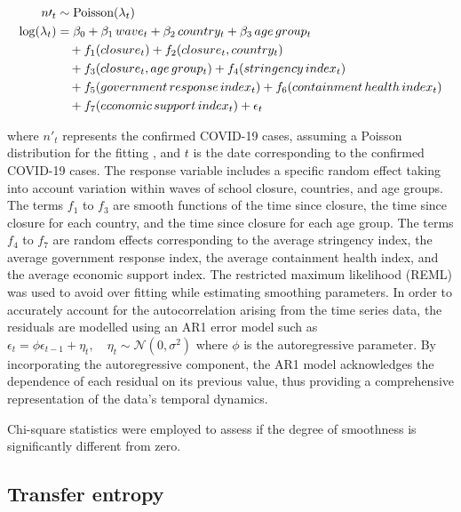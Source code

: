 \documentclass[Harvard,Times1COL]{WileyNJDv5}
\begin{document}
{\begin{equation}\label{eq-gam}{
\begin{aligned}[t]
  n\prime_t &\sim \text{Poisson}(\lambda_t) \\
  \log(\lambda_t) &= \beta_0 + \beta_1\,wave_t + \beta_2\,country_t + \beta_3\,age\,group_t \\
  &\quad + f_1(closure_t) + f_2(closure_t, country_t) \\
  &\quad + f_3(closure_t, age\,group_t) + f_4(stringency\,index_t) \\
  &\quad + f_5(government\,response\,index_t) + f_6(containment\,health\,index_t) \\
  &\quad + f_7(economic\,support\,index_t) +\epsilon_t
\end{aligned}
}\end{equation}

\noindent where \(n\prime_t\) represents the confirmed COVID-19 cases,
assuming a Poisson distribution for the fitting \citep{loader2006local},
and \(t\) is the date corresponding to the confirmed COVID-19 cases. The
response variable includes a specific random effect taking into account
variation within waves of school closure, countries, and age groups. The
terms \(f_1\) to \(f_3\) are smooth functions of the time since closure,
the time since closure for each country, and the time since closure for
each age group. The terms \(f_4\) to \(f_7\) are random effects
corresponding to the average stringency index, the average government
response index, the average containment health index, and the average
economic support index. The restricted maximum likelihood (REML) was
used to avoid over fitting while estimating smoothing parameters. In
order to accurately account for the autocorrelation arising from the
time series data, the residuals are modelled using an AR1 error model
such as
\(\epsilon_t = \phi \epsilon_{t-1} + \eta_t, \quad \eta_t \sim \mathcal{N}(0, \sigma^2)\)
where \(\phi\) is the autoregressive parameter. By incorporating the
autoregressive component, the AR1 model acknowledges the dependence of
each residual on its previous value, thus providing a comprehensive
representation of the data's temporal dynamics.

Chi-square statistics were employed to assess if the degree of
smoothness is significantly different from zero.

\subsection{Transfer entropy}\label{transfer-entropy}

}
\end{document}
